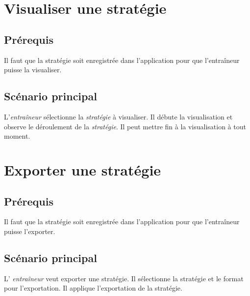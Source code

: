 \section{Visualiser une stratégie}
\label{sec:visualiser_une_strategie}

\subsection{Pr\'erequis}
\label{sub:prerequis}
Il faut que la strat\'egie soit enregistr\'ee dans l'application pour que l'entraîneur puisse la visualiser.

\subsection{Sc\'enario principal}
\label{sub:sc'enario_principal}

L'\textit{entra\^ineur} s\'electionne la \textit{strat\'egie} \`a visualiser.
Il d\'ebute la visualisation et observe le d\'eroulement de la \textit{strat\'egie}.
Il peut mettre fin \`a la visualisation \`a tout moment.

\section{Exporter une stratégie}
\label{sec:exporter_une_strategie}

\subsection{Pr\'erequis}
\label{sub:prerequis}
Il faut que la strat\'egie soit enregistr\'ee dans l'application pour que l'entraîneur puisse l'exporter.

\subsection{Sc\'enario principal}
\label{sub:sc'enario_principal}

L' \textit{entra\^ineur} veut exporter une strat\'egie.
Il s\'electionne la strat\'egie et le format pour l'exportation.
Il applique l'exportation de la strat\'egie.
